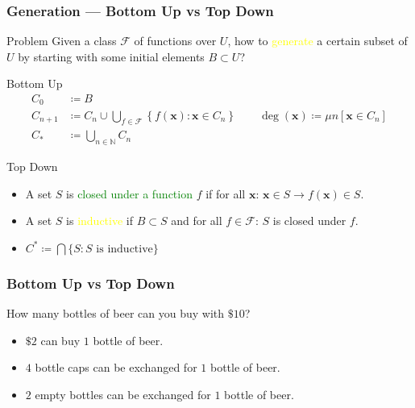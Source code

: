 \documentclass[UTF8,11pt,colorlinks,compress,openany]{beamer}%
\begin{document}
\begin{frame}\frametitle{Generation --- Bottom Up vs Top Down}
\setlength\abovedisplayskip{0pt}
\setlength\belowdisplayskip{0pt}
	\begin{block}{Problem}
		Given a class $\mathcal{F}$ of functions over $U$, how to \textcolor{yellow}{generate} a certain subset of $U$ by starting with some initial elements $B\subset U$?
	\end{block}
			\begin{block}{Bottom Up}\vspace{-4pt}
				\begin{align*}
				C_0&\coloneqq B\\ C_{n+1}&\coloneqq C_n\cup\bigcup\limits_{f\in\mathcal{F}}\left\{f(\mathbf{x}): \mathbf{x}\in C_n\right\}\qquad\operatorname{deg}(\mathbf{x})\coloneqq \mu n\left[\mathbf{x}\in C_n\right]\\
				C_*&\coloneqq \bigcup\limits_{n\in\mathbb{N}} C_n
				\end{align*}
			\end{block}
			\begin{block}{Top Down}
				\begin{itemize}
					\item A set $S$ is \textcolor{green}{closed under a function} $f$ if for all $\mathbf{x}$: $\mathbf{x}\in S\to f(\mathbf{x})\in S$.
					\item A set $S$ is \textcolor{yellow}{inductive} if $B\subset S$ and for all $f\in\mathcal{F}$: $S$ is closed under $f$.
					\item $C^*\coloneqq \bigcap\{S: S\mbox{ is inductive}\}$
				\end{itemize}
			\end{block}
\end{frame}

\begin{frame}\frametitle{Bottom Up vs Top Down}
	\begin{block}{How many bottles of beer can you buy with $\$10$?}
		\begin{itemize}
		\item $\$2$ can buy $1$ bottle of beer.
		\item $4$ bottle caps can be exchanged for $1$ bottle of beer.
		\item $2$ empty bottles can be exchanged for $1$ bottle of beer.
		\end{itemize}
	\end{block}
\end{frame}
\end{document}
